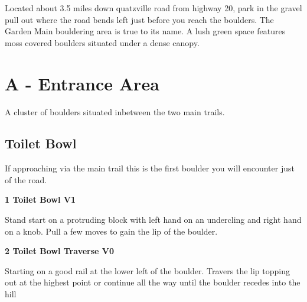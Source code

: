 

\raggedcolumns
\begin{multicols}{2}

\end{multicols}
\begin{multicols}{2}
Located about 3.5 miles down quatzville road from highway 20, park in the gravel pull out where the road bends left just before you reach the boulders. The Garden Main bouldering area is true to its name. A lush green space features moss covered boulders situated under a dense canopy.\\

\newpage

		\section{A - Entrance Area}\label{sa:Entrance Area}
	A cluster of boulders situated inbetween the two main trails.\\

	
		\subsection*{Toilet Bowl}\label{bf:Toilet Bowl}
		If approaching via the main trail this is the first boulder you will encounter just of the road.\\
	

			\label{rt:Toilet Bowl}
\colorbox{green!20}{
\parbox{0.95\linewidth}{
\textbf{
1 Toilet Bowl V1  
}
}
}

			\begin{adjustwidth}{0.5cm}{}				
			Stand start on a protruding block with left hand on an undercling and right hand on a knob. Pull a few moves to gain the lip of the boulder.
			\end{adjustwidth}
			\label{rt:Toilet Bowl Traverse}
\colorbox{green!20}{
\parbox{0.95\linewidth}{
\textbf{
2 Toilet Bowl Traverse V0  
}
}
}

			\begin{adjustwidth}{0.5cm}{}				
			Starting on a good rail at the lower left of the boulder. Travers the lip topping out at the highest point or continue all the way until the boulder recedes into the hill
			\end{adjustwidth}


\end{multicols}
